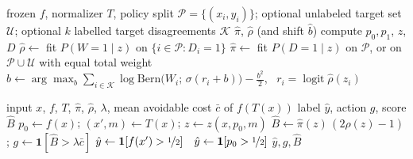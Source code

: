 \begin{algorithm}[t]
\small
\caption{Training (labels from the policy split only)}
\label{alg:train}
\begin{algorithmic}[1]
\Require frozen $f$, normalizer $T$, policy split $\mathcal P=\{(x_i,y_i)\}$; optional unlabeled target set $\mathcal U$; optional $k$ labelled target disagreements $\mathcal K$
\Ensure $\hat\pi$, $\hat\rho$ (and shift $\hat b$)
 compute $p_0,p_1$, $z$, $D$ \EndFor
\State $\hat\rho\gets$ fit $P(W{=}1\mid z)$ on $\{i\in\mathcal P: D_i=1\}$ 
\State $\hat\pi\gets$ fit $P(D{=}1\mid z)$ on $\mathcal P$, or on $\mathcal P\cup\mathcal U$ with equal total weight 
 
  \State $\hat b\gets\arg\max_b \sum_{i\in\mathcal K}\log\mathrm{Bern}\big(W_i;\,\sigma(r_i+b)\big)-\tfrac{b^2}{2}$, \ $r_i=\operatorname{logit}\hat\rho(z_i)$
\EndIf
\end{algorithmic}
\end{algorithm}

\begin{algorithm}[t]
\small
\caption{Inference}
\label{alg:infer}
\begin{algorithmic}[1]
\Require input $x$, $f$, $T$, $\hat\pi$, $\hat\rho$, $\lambda$, mean avoidable cost $\bar c$ of $f(T(x))$
\Ensure label $\hat y$, action $g$, score $\hat B$
\State $p_0\gets f(x)$; $(x',m)\gets T(x)$; $z\gets z(x,p_0,m)$
\State $\hat B\gets\hat\pi(z)\,(2\hat\rho(z)-1)$; $g\gets\mathbf 1[\hat B>\lambda\bar c]$
 $\hat y\gets\mathbf 1[f(x')>\nicefrac12]$ 
\Else\ $\hat y\gets\mathbf 1[p_0>\nicefrac12]$ \EndIf
\State \Return $\hat y,g,\hat B$
\end{algorithmic}
\end{algorithm}
